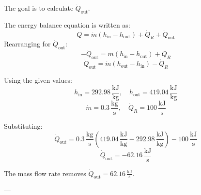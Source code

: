 The goal is to calculate \( \dot{Q}_{\text{out}} \).  

The energy balance equation is written as:  
\[
Q = \dot{m} (h_{\text{in}} - h_{\text{out}}) + \dot{Q}_R + \dot{Q}_{\text{out}}
\]  
Rearranging for \( \dot{Q}_{\text{out}} \):  
\[
-\dot{Q}_{\text{out}} = \dot{m} (h_{\text{in}} - h_{\text{out}}) + \dot{Q}_R
\]  
\[
\dot{Q}_{\text{out}} = \dot{m} (h_{\text{out}} - h_{\text{in}}) - \dot{Q}_R
\]  

Using the given values:  
\[
h_{\text{in}} = 292.98 \, \frac{\text{kJ}}{\text{kg}}, \quad h_{\text{out}} = 419.04 \, \frac{\text{kJ}}{\text{kg}}
\]  
\[
\dot{m} = 0.3 \, \frac{\text{kg}}{\text{s}}, \quad \dot{Q}_R = 100 \, \frac{\text{kJ}}{\text{s}}
\]  

Substituting:  
\[
\dot{Q}_{\text{out}} = 0.3 \, \frac{\text{kg}}{\text{s}} (419.04 \, \frac{\text{kJ}}{\text{kg}} - 292.98 \, \frac{\text{kJ}}{\text{kg}}) - 100 \, \frac{\text{kJ}}{\text{s}}
\]  
\[
\dot{Q}_{\text{out}} = -62.16 \, \frac{\text{kJ}}{\text{s}}
\]  

The mass flow rate removes \( \dot{Q}_{\text{out}} = 62.16 \, \frac{\text{kJ}}{\text{s}} \).  

---